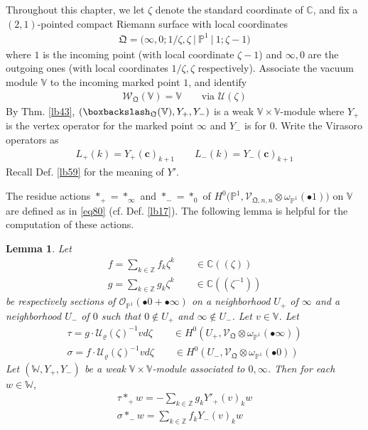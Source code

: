 \documentclass[11pt,b5paper,notitlepage]{article}
\theoremstyle{definition}
\theoremstyle{plain}
\newtheorem{lm}[df]{Lemma}
\newcommand{\mc}{\mathcal}
\newcommand{\SV}{\mathscr{V}}
\newcommand{\scr}{\mathscr}
\newcommand{\blt}{\bullet}
\newcommand{\Vbb}{\mathbb V}
\newcommand{\Wbb}{\mathbb W}
\newcommand{\Cbb}{\mathbb C}
\newcommand{\Zbb}{\mathbb Z}
\newcommand{\Pbb}{\mathbb P}
\newcommand{\cbf}{\mathbf c}
\newcommand{\<}{\left\langle}
\renewcommand{\>}{\right\rangle}
\newcommand{\bbs}{\boxbackslash}
\newcommand{\fq}{{\mathfrak Q}}
\numberwithin{equation}{section}
\begin{document}
Throughout this chapter, we let $\zeta$ denote the standard coordinate of $\Cbb$, and fix  a $(2,1)$-pointed compact Riemann surface with local coordinates
\begin{align}
\fq=\big(\infty,0;1/\zeta,\zeta~\big|~\Pbb^1~\big|~1;\zeta-1\big)
\end{align}
where $1$ is the incoming point (with local coordinate $\zeta-1$) and $\infty,0$ are the outgoing ones (with local coordinates $1/\zeta,\zeta$ respectively). Associate the vacuum module $\Vbb$ to the incoming marked point $1$, and identify
\begin{align*}
\scr W_\fq(\Vbb)=\Vbb\qquad\text{via }\mc U(\zeta)
\end{align*} 
By Thm. \ref{lb43}, $(\bbs_\fq(\Vbb),Y_+,Y_-)$  is a weak $\Vbb\times\Vbb$-module where $Y_+$  is the vertex operator for the marked point $\infty$ and $Y_-$ is for $0$. Write the Virasoro operators as
\begin{align}
L_+(k)=Y_+(\cbf)_{k+1}\qquad L_-(k)=Y_-(\cbf)_{k+1}
\end{align}
Recall Def. \ref{lb59} for the meaning of $Y'$. 

The residue actions $*_+=*_\infty$ and $*_-=*_0$ of $H^0\big(\Pbb^1, \SV_{\fq,n,n}\otimes \omega_{\Pbb^1}(\bullet 1)\big)$ on $\Vbb$ are defined as in \eqref{eq80} (cf. Def. \ref{lb17}). The following lemma is helpful for the computation of these actions.


\begin{lm}\label{lb73}
Let
\begin{subequations}
\begin{gather}
f=\sum_{k\in\Zbb} f_k\zeta^k\qquad\in\Cbb((\zeta))\\
g=\sum_{k\in\Zbb} g_k\zeta^k\qquad\in\Cbb((\zeta^{-1}))
\end{gather}
\end{subequations}
be respectively sections of $\mc O_{\Pbb^1}(\blt 0+\blt\infty)$ on a neighborhood $U_+$ of $\infty$ and a neighborhood $U_-$ of $0$ such that $0\notin U_+$ and $\infty\notin U_-$. Let $v\in\Vbb$. Let
\begin{gather*}
\tau=g\cdot \mc U_\varrho(\zeta)^{-1}vd\zeta\qquad\in H^0(U_+,\scr V_\fq\otimes\omega_{\Pbb^1}(\blt \infty))\\
\sigma=f\cdot \mc U_\varrho(\zeta)^{-1}vd\zeta\qquad\in H^0(U_-,\scr V_\fq\otimes\omega_{\Pbb^1}(\blt 0))
\end{gather*} 
Let $(\Wbb,Y_+,Y_-)$ be a weak $\Vbb\times\Vbb$-module associated to $0,\infty$. Then for each $w\in\Wbb$,
\begin{subequations}\label{eq145}
\begin{gather}
\tau*_+ w=-\sum_{k\in\Zbb}g_k Y'_+(v)_k w  \label{eq131}\\
\sigma *_- w=\sum_{k\in\Zbb} f_k Y_-(v)_kw  \label{eq130}
\end{gather}
\end{subequations}
\end{lm}
\end{document}
